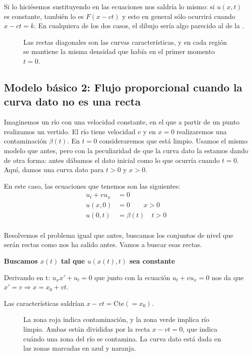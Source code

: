 			Si lo hiciésemos sustituyendo en las ecuaciones nos saldría lo mismo: si $u(x,t)$ es constante, también lo es $F(x-ct)$ y esto en general sólo ocurrirá cuando $x - ct = k$. En cualquiera de los dos casos, el dibujo sería algo parecido al de la .

			\begin{figure}
			\centering
			\caption{Las rectas diagonales son las curvas características, y en cada región se mantiene la misma densidad que había en el primer momento $t = 0$.}
			\label{fig:ConjNivelCochesSimple}
			\end{figure}



	\subsection{Modelo básico 2: Flujo proporcional cuando la curva dato no es una recta}

		Imaginemos un río con una velocidad constante, en el que a partir de un punto realizamos un vertido. El río tiene velocidad $v$ y en $x=0$ realizaremos una contaminación $\beta(t)$. En $t=0$ consideraremos que está limpio. Usamos el mismo modelo que antes, pero con la peculiaridad de que la curva dato la estamos dando de otra forma: antes dábamos el dato inicial como lo que ocurría cuando $t = 0$. Aquí, damos una curva dato para $t > 0$ y $x > 0$.

		En este caso, las ecuaciones que tenemos son las siguientes:
		\begin{align*}
		u_t + vu_x &= 0 \\
		u(x,0) &= 0 \qquad x>0 \\
		u(0,t) &= \beta(t)\quad t>0 \\
		\end{align*}

		Resolvemos el problema igual que antes, buscamos los conjuntos de nivel que serán rectas como nos ha salido antes. Vamos a buscar esas rectas.

		\textbf{Buscamos $x(t)$ tal que $u(x(t),t)$ sea constante}

		Derivando en t: $u_x x' + u_t = 0$ que junto con la ecuación $u_t + v u_x = 0$ nos da que $x' = v \Rightarrow x = x_0 + vt $.

		Las características saldrían \(x-vt = \text{Cte}(=x_0) \label{eq:rio_vcte}\).

		\begin{figure}[hbtp]
			\centering
			\caption{La zona roja indica contaminación, y la zona verde implica río limpio. Ambas están divididas por la recta $x - vt = 0$, que indica cuándo una zona del río se contamina. La curva dato está dada en las zonas marcadas en azul y naranja.}
			\label{fig:ContaminacionRio}
		\end{figure}

